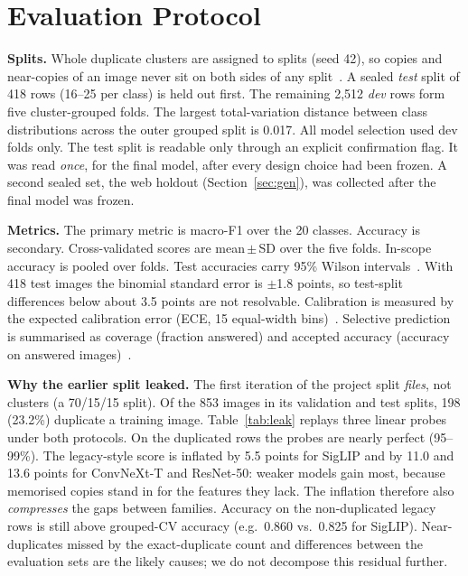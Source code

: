 \documentclass[conference]{IEEEtran}
\begin{document}
\section{Evaluation Protocol}\label{sec:protocol}
\textbf{Splits.} Whole duplicate clusters are assigned to splits (seed 42), so copies and near-copies of an image never
sit on both sides of any split~\cite{roberts2017cv}. A sealed \emph{test} split of 418 rows (16--25 per class) is held
out first. The remaining 2,512 \emph{dev} rows form five cluster-grouped folds. The largest total-variation distance
between class distributions across the outer grouped split is 0.017. All model selection used dev folds only. The test
split is readable only through an explicit confirmation flag. It was read \emph{once}, for the final model, after
every design choice had been frozen. A second sealed set, the web holdout (Section~\ref{sec:gen}), was collected after
the final model was frozen.

\textbf{Metrics.} The primary metric is macro-F1 over the 20 classes. Accuracy is secondary. Cross-validated scores are
mean\,$\pm$\,SD over the five folds. In-scope accuracy is pooled over folds. Test accuracies carry 95\% Wilson
intervals~\cite{wilson1927}. With 418 test images the binomial standard error is $\pm$1.8 points, so test-split
differences below about 3.5 points are not resolvable. Calibration is measured by the expected calibration error (ECE,
15 equal-width bins)~\cite{guo2017calibration}. Selective prediction is summarised as coverage (fraction answered)
and accepted accuracy (accuracy on answered images)~\cite{geifman2017selective}.

\textbf{Why the earlier split leaked.} The first iteration of the project split \emph{files}, not clusters (a
70/15/15 split). Of the 853 images in its validation and test splits, 198 (23.2\%) duplicate a training image.
Table~\ref{tab:leak} replays three linear probes under both protocols. On the duplicated rows the probes are nearly
perfect (95--99\%). The legacy-style score is inflated by 5.5 points for SigLIP and by 11.0 and 13.6 points for
ConvNeXt-T and ResNet-50: weaker models gain most, because memorised copies stand in for the features they lack. The
inflation therefore also \emph{compresses} the gaps between families. Accuracy on the non-duplicated legacy rows is
still above grouped-CV accuracy (e.g.\ 0.860 vs.\ 0.825 for SigLIP). Near-duplicates missed by the exact-duplicate
count and differences between the evaluation sets are the likely causes; we do not decompose this residual further.
\end{document}
